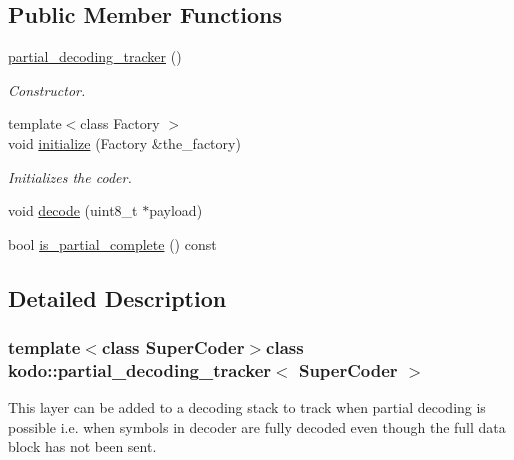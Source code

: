 \subsection*{Public Member Functions}
\begin{DoxyCompactItemize}
\item 
\hypertarget{classkodo_1_1partial__decoding__tracker_a6878a4e001ef59da2a892350e1927527}{\hyperlink{classkodo_1_1partial__decoding__tracker_a6878a4e001ef59da2a892350e1927527}{partial\-\_\-decoding\-\_\-tracker} ()}\label{classkodo_1_1partial__decoding__tracker_a6878a4e001ef59da2a892350e1927527}

\begin{DoxyCompactList}\small\item\em Constructor. \end{DoxyCompactList}\item 
{\footnotesize template$<$class Factory $>$ }\\void \hyperlink{classkodo_1_1partial__decoding__tracker_a64bbc1d447d0132af8896012c2363403}{initialize} (Factory \&the\-\_\-factory)
\begin{DoxyCompactList}\small\item\em Initializes the coder. \end{DoxyCompactList}\item 
void \hyperlink{classkodo_1_1partial__decoding__tracker_afe4322f2e809db0c31472b38372e8434}{decode} (uint8\-\_\-t $\ast$payload)
\begin{DoxyCompactList}\small\item\em \end{DoxyCompactList}\item 
bool \hyperlink{classkodo_1_1partial__decoding__tracker_ab682c510706b0f941144a2534b4fcd3f}{is\-\_\-partial\-\_\-complete} () const 
\end{DoxyCompactItemize}


\subsection{Detailed Description}
\subsubsection*{template$<$class Super\-Coder$>$class kodo\-::partial\-\_\-decoding\-\_\-tracker$<$ Super\-Coder $>$}

This layer can be added to a decoding stack to track when partial decoding is possible i.\-e. when symbols in decoder are fully decoded even though the full data block has not been sent. 

